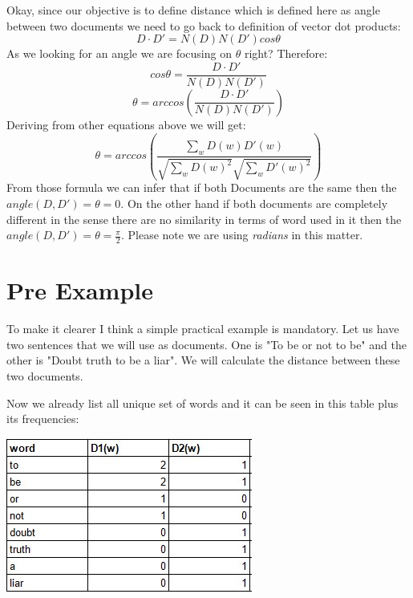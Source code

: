 \documentclass{article}
\begin{document}
    Okay, since our objective is to define distance which is defined here as angle between two documents we need to go back to definition of vector dot products:
    \begin{equation*}
        D \cdot D' = N(D) N(D') cos \theta
    \end{equation*}
    As we looking for an angle we are focusing on $\theta$ right?
    Therefore:
    \begin{equation*}
        cos \theta = \frac{D \cdot D'}{N(D)N(D')}
    \end{equation*}
    \begin{equation*}
        \theta = arccos \left( \frac{D \cdot D'}{N(D)N(D')} \right)
    \end{equation*}
    Deriving from other equations above we will get:
    \[
      \theta = arccos \left( \frac{\sum_{w}{D(w)D'(w)}}{\sqrt{\sum_{w}{D(w)^{2}}} \sqrt{\sum_{w}{D'(w)^{2}}}}\right)  
    \]
    From those formula we can infer that if both Documents are the same then the $angle(D,D') = \theta = 0$.
    On the other hand if both documents are completely different in the sense there are no similarity in terms of word used in it then the $angle(D,D') = \theta = \frac{\pi}{2}$. Please note we are using \emph{radians} in this matter.

    \section*{Pre Example}
    To make it clearer I think a simple practical example is mandatory. 
    Let us have two sentences that we will use as documents. 
    One is "To be or not to be" and the other is "Doubt truth to be a liar". 
    We will calculate the distance between these two documents.

    Now we already list all unique set of words and it can be seen in this table plus its frequencies:
    \begin{center}
        \includegraphics{table word frequencies}    
    \end{center}
        
\end{document}
